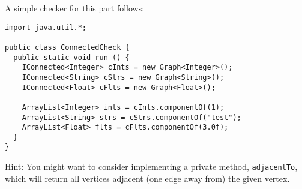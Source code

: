 \documentclass{article}
\begin{document}
A simple checker for this part follows:

\begin{verbatim}
import java.util.*;

public class ConnectedCheck {
  public static void run () {
    IConnected<Integer> cInts = new Graph<Integer>();
    IConnected<String> cStrs = new Graph<String>();
    IConnected<Float> cFlts = new Graph<Float>();

    ArrayList<Integer> ints = cInts.componentOf(1);
    ArrayList<String> strs = cStrs.componentOf("test");
    ArrayList<Float> flts = cFlts.componentOf(3.0f);
  }
}
\end{verbatim}

Hint: You might want to consider implementing a private method,
\texttt{adjacentTo}, which will return all vertices adjacent (one edge away
from) the given vertex.
\end{document}

